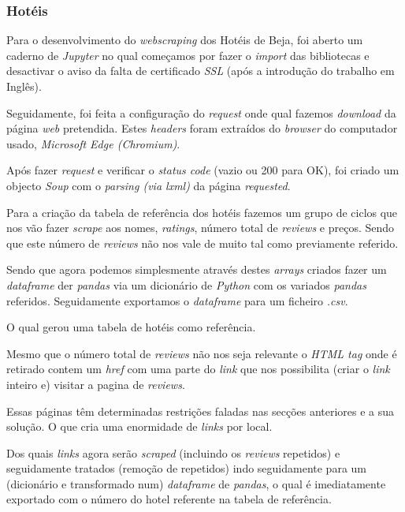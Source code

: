 \subsubsection{Hotéis}

Para o desenvolvimento do \textit{webscraping} dos Hotéis de Beja, foi aberto um caderno de \textit{Jupyter} no qual começamos por fazer o \textit{import} das bibliotecas e desactivar o aviso da falta de certificado \textit{SSL} (após a introdução do trabalho em Inglês).

Seguidamente, foi feita a configuração do \textit{request} onde qual fazemos \textit{download} da página \textit{web} pretendida. Estes \textit{headers} foram extraídos do \textit{browser} do computador usado, \textit{Microsoft Edge (Chromium)}.

Após fazer \textit{request} e verificar o \textit{status code} (vazio ou 200 para OK), foi criado um objecto \textit{Soup} com o \textit{parsing (via lxml)} da página \textit{requested}.

Para a criação da tabela de referência dos hotéis fazemos um grupo de ciclos que nos vão fazer \textit{scrape} aos nomes, \textit{ratings}, número total de \textit{reviews} e preços. Sendo que este número de \textit{reviews} não nos vale de muito tal como previamente referido.

Sendo que agora podemos simplesmente através destes \textit{arrays} criados fazer um \textit{dataframe} der \textit{pandas} via um dicionário de \textit{Python} com os variados \textit{pandas} referidos. Seguidamente exportamos o \textit{dataframe} para um ficheiro \textit{.csv}.

O qual gerou uma tabela de hotéis como referência.

Mesmo que o número total de \textit{reviews} não nos seja relevante o \textit{HTML tag} onde é retirado contem um \textit{href} com uma parte do \textit{link} que nos possibilita (criar o \textit{link} inteiro e) visitar a pagina de \textit{reviews}.

Essas páginas têm determinadas restrições faladas nas secções anteriores e a sua solução. O que cria uma enormidade de \textit{links} por local.

Dos quais \textit{links} agora serão \textit{scraped} (incluindo os \textit{reviews} repetidos) e seguidamente tratados (remoção de repetidos) indo seguidamente para um (dicionário e transformado num) \textit{dataframe} de \textit{pandas}, o qual é imediatamente exportado com o número do hotel referente na tabela de referência.

